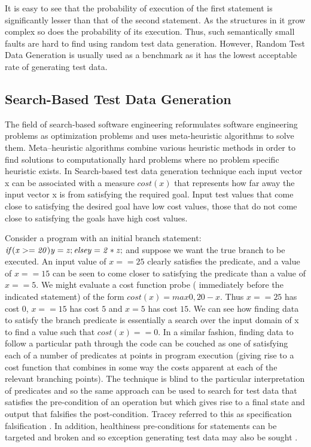 It is easy to see that the probability of execution of the first statement is significantly lesser than that of the second statement. As the structures in it grow complex so does the probability of its execution. Thus, such semantically small faults are hard to find using random test data generation. However, Random Test Data Generation is usually used as a benchmark as it has the lowest acceptable rate of generating test data.

\subsection{Search-Based Test Data Generation}
The field of search-based software engineering reformulates software engineering problems as optimization problems and uses meta-heuristic algorithms to solve them. Meta–heuristic algorithms combine various heuristic methods in order to find solutions to computationally hard problems where no problem specific heuristic exists. In Search-based test data generation technique each input vector x can be associated with a measure $cost(x)$ that represents how far away the input vector x is from satisfying the required goal. Input test values that come close to satisfying the desired goal have low cost values, those that do not come close to satisfying the goals have high cost values. 

Consider a program with an initial branch statement: ${\it{ if (x >= 20) y = z; else y = 2 * z;}}$ and suppose we want the true branch to be executed. An input value of $x == 25$ clearly satisfies the predicate, and a value of $x == 15$ can be seen to come closer to satisfying the predicate than a value of $x ==5$. We might evaluate a cost function probe ( immediately before the indicated statement) of the form $cost(x) = max {0, 20 - x}$. Thus $x == 25$ has cost $0$, $x == 15$ has cost $5$ and $x = 5$ has cost $15$. We can see how finding data to satisfy the branch predicate is essentially a search over the input domain of x to find a value such that $cost(x) == 0$. In a similar fashion, finding data to follow a particular path through the code can be couched as one of satisfying each of a number of predicates at points in program execution (giving rise to a cost function that combines in some way the costs apparent at each of the relevant branching points).  The technique is blind to the particular interpretation of predicates and so the same approach can be used to search for test data that satisfies the pre-condition of an operation but which gives rise to a final state and output that falsifies the post-condition. Tracey referred to this as specification falsification \cite{tracey1998automated}. In addition, healthiness pre-conditions for statements can be targeted and broken and so exception generating test data may also be sought \cite{tracey2000automated}. 

